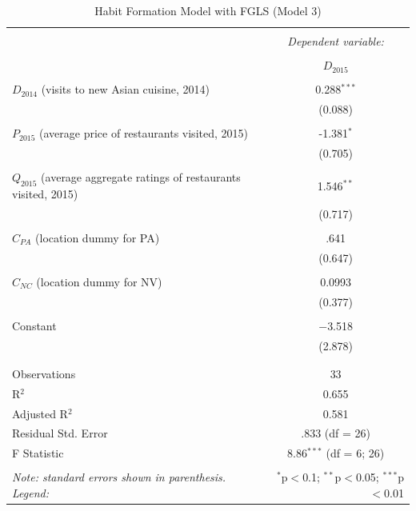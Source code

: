 \documentclass[Journal,letterpaper, NoLineNumbers]{ascelike-new}
\begin{document}
\begin{table}[!htbp] \centering 
  \caption{Habit Formation Model with FGLS (Model 3)} 
  \label{} 
\begin{tabular}{@{\extracolsep{5pt}}lc} 
\\[-1.8ex]\hline 
\hline \\[-1.8ex] 
 & \multicolumn{1}{c}{\textit{Dependent variable:}} \\ 
\cline{2-2} 
\\[-1.8ex] & $D_{2015}$\\ 
\hline \\[-1.8ex] 
 $D_{2014}$ (visits to new Asian cuisine, 2014) & 0.288$^{***}$ \\ 
  & (0.088) \\ 
  & \\ 
 $P_{2015}$ (average price of restaurants visited, 2015) & -1.381$^{*}$ \\ 
  & (0.705) \\ 
  & \\ 
 $Q_{2015}$ (average aggregate ratings of restaurants visited, 2015) & 1.546$^{**}$ \\ 
  & (0.717) \\ 
  & \\ 
 $C_{PA}$ (location dummy for PA)& .641 \\ 
  & (0.647) \\ 
  & \\ 
 $C_{NC}$ (location dummy for NV)& 0.0993 \\ 
  & (0.377) \\ 
  & \\ 
 Constant & $-$3.518 \\ 
  & (2.878) \\ 
  & \\ 
\hline \\[-1.8ex] 
Observations & 33 \\ 
R$^{2}$ & 0.655 \\ 
Adjusted R$^{2}$ & 0.581 \\ 
Residual Std. Error & .833 (df = 26) \\ 
F Statistic & 8.86$^{***}$ (df = 6; 26) \\ 
\hline 
\hline \\[-1.8ex] 
\textit{Note: standard errors shown in parenthesis. Legend: }  & \multicolumn{1}{r}{$^{*}$p$<$0.1; $^{**}$p$<$0.05; $^{***}$p$<$0.01} \\ 
\end{tabular} 
\end{table}
\end{document}
